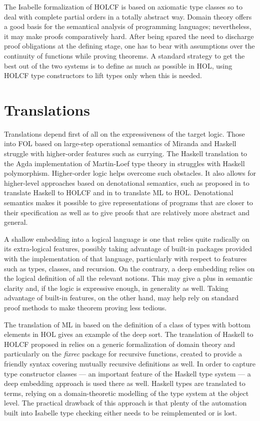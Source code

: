\documentclass{llncs}
\begin{document}
The Isabelle formalization of HOLCF is based on axiomatic type classes
\cite{Wenzel} so to deal with complete partial orders in a totally
abstract way. Domain theory offers a good basis for the semantical
analysis of programming languages; nevertheless, it may make proofs
comparatively hard.  After being spared the need to discharge proof
obligations at the defining stage, one has to bear with assumptions
over the continuity of functions while proving theorems. A standard
strategy to get the best out of the two systems is to define as much
as possible in HOL, using HOLCF type constructors to lift types only
when this is needed.


\section{Translations}
\label{sec:Translations}

Translations depend first of all on the expressiveness of the target
logic. Those into FOL based on large-step operational semantics of
Miranda \cite{Thompson95,Thompson89,Thompson95b} and Haskell
\cite{Thompson92} struggle with higher-order features such as
currying.  The Haskell translation to the Agda implementation of
Martin-Loef type theory in \cite{Abel} struggles with Haskell
polymorphism. Higher-order logic helps overcome such obstacles. It
also allows for higher-level approaches based on denotational
semantics, such as proposed in \cite{Huff} to translate Haskell to
HOLCF and in \cite{Pollack} to translate ML to HOL. Denotational
semantics makes it possible to give representations of programs that
are closer to their specification as well as to give proofs that are
relatively more abstract and general.

A shallow embedding into a logical language is one that relies quite
radically on its extra-logical features, possibly taking advantage of
built-in packages provided with the implementation of that language,
particularly with respect to features such as types, classes, and
recursion. On the contrary, a deep embedding relies on the logical
definition of all the relevant notions. This may give a plus in
semantic clarity and, if the logic is expressive enough, in generality
as well. Taking advantage of built-in features, on the other hand, may
help rely on standard proof methods to make theorem proving less
tedious.

The translation of ML in \cite{Pollack} based on the definition of a
class of types with bottom elements in HOL gives an example of the
deep sort. The translation of Haskell to HOLCF proposed in \cite{Huff}
relies on a generic formalization of domain theory and particularly on
the \emph{fixrec} package for recursive functions, created to provide
a friendly syntax covering mutually recursive definitions as well.  In
order to capture type constructor classes --- an important feature of
the Haskell type system --- a deep embedding approach is used there as
well.  Haskell types are translated to terms, relying on a
domain-theoretic modelling of the type system at the object level. The
practical drawback of this approach is that plenty of the automation
built into Isabelle type checking either needs to be reimplemented or
is lost.
\end{document}
